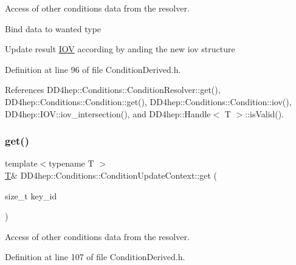 Access of other conditions data from the resolver. 

Bind data to wanted type

Update result \hyperlink{class_d_d4hep_1_1_i_o_v}{I\+OV} according by and\textquotesingle{}ing the new iov structure 

Definition at line 96 of file Condition\+Derived.\+h.



References D\+D4hep\+::\+Conditions\+::\+Condition\+Resolver\+::get(), D\+D4hep\+::\+Conditions\+::\+Condition\+::get(), D\+D4hep\+::\+Conditions\+::\+Condition\+::iov(), D\+D4hep\+::\+I\+O\+V\+::iov\+\_\+intersection(), and D\+D4hep\+::\+Handle$<$ T $>$\+::is\+Valid().

\hypertarget{class_d_d4hep_1_1_conditions_1_1_condition_update_context_ad3a02c60524b952ec75238a197353a7b}{}\label{class_d_d4hep_1_1_conditions_1_1_condition_update_context_ad3a02c60524b952ec75238a197353a7b} 
\subsubsection{\texorpdfstring{get()}{get()}\hspace{0.1cm}{\footnotesize\ttfamily [3/4]}}
{\footnotesize\ttfamily template$<$typename T $>$ \\
\hyperlink{class_t}{T}\& D\+D4hep\+::\+Conditions\+::\+Condition\+Update\+Context\+::get (\begin{DoxyParamCaption}\item[{size\+\_\+t}]{key\+\_\+id }\end{DoxyParamCaption})\hspace{0.3cm}{\ttfamily [inline]}}



Access of other conditions data from the resolver. 



Definition at line 107 of file Condition\+Derived.\+h.

\hypertarget{class_d_d4hep_1_1_conditions_1_1_condition_update_context_a2cae217c5f09d132ceee40d8aeba807d}{}\label{class_d_d4hep_1_1_conditions_1_1_condition_update_context_a2cae217c5f09d132ceee40d8aeba807d} 
